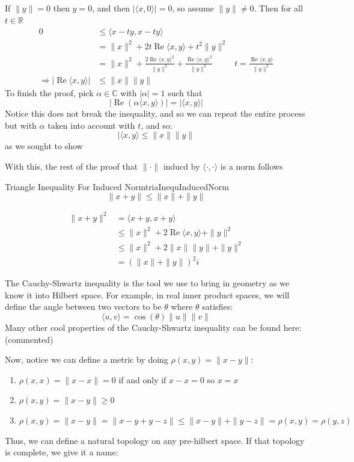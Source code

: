 \documentclass[oneside]{book}
\newcommand{\R}{\mathbb{R}}
\newcommand{\C}{\mathbb{C}}
\renewcommand{\Re}{\operatorname{Re}}
\newcommand{\Rw}{\Rightarrow}
\begin{document}
\begin{Proof}
If $\|y\| = 0$ then $y = 0$, and then $|\langle x,0\rangle| = 0$, so assume $\|y\| \ne 0$. Then for all $t \in \R$
\begin{align*}
	0 & \le \langle x-ty, x-ty\rangle\\
	  &= \|x\|^2 + 2t\Re\langle x,y\rangle + t^2\|y\|^2\\
	  &= \|x\|^2 + \frac{2\Re\langle x,y\rangle^2}{\|y\|^2} + \frac{\Re\langle x,y\rangle^2}{\|y\|^2}&t
	  = \frac{\Re\langle x,y\rangle}{\|y\|^2}\\
	\Rw |\Re\langle x,y\rangle| &\le \|x\|\|y\|
\end{align*}
To finish the proof, pick $\alpha \in \C$ with $|\alpha| = 1$ such that
\[
	|\Re(\alpha\langle x,y\rangle)| = |\langle x,y\rangle|
\]
Notice this does not break the inequality, and so we can repeat the entire process but with $\alpha$ taken into
account with $t$, and so:
\[
	|\langle x,y\rangle \le \|x\|\|y\|
\]
as we sought to show
\end{Proof}

With this, the rest of the proof  that $\|\cdot \|$ inducd by $\langle \cdot, \cdot\rangle$ is a norm follows

\begin{thm}{Triangle Inequality For Induced Norm}{triaInequInducedNorm}
\[
	\|x+y\| \le \|x\| + \|y\|
\]
\end{thm}

\begin{Proof}
\begin{align*}
	\|x+y\|^2  &= \langle x+y, x+y\rangle\\
			   &\le \|x\|^2 + 2\Re\langle x,y\rangle + \|y\|^2\\
			   &\le \|x\|^2  + 2\|x\|\|y\| + \|y\|^2\\
			   &= (\|x\| + \|y\|)^2i
\end{align*}
\end{Proof}

The Cauchy-Shwartz inequality is the tool we use to bring in geometry as we know it into Hilbert space. For example, in
real inner product spaces, we will define the angle between two vectors to be $\theta$ where $\theta$ satisfies:
\[
\langle u,v\rangle = \cos(\theta) \|u\|\|v\|
\]
Many other cool properties of the Cauchy-Shwartz inequality can be found here: (commented) %

Now, notice we can define a metric by doing $\rho(x,y) = \|x-y\|$:
\begin{enumerate}
\item $\rho(x,x) = \|x-x\| = 0$ if and only if $x-x = 0$ so $x = x$
\item $\rho(x,y) = \|x-y\| \ge 0$
\item $\rho(x,y) = \|x-y\| = \|x-y+y-z\| \le \|x-y\| + \|y-z\| = \rho(x,y) = \rho(y,z)$
\end{enumerate}
Thus, we can define a natural topology on any pre-hilbert space. If that topology is complete, we give it a name:
\end{document}
